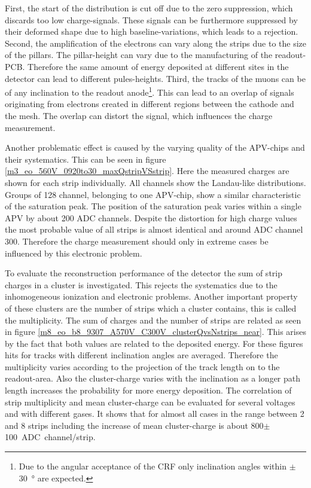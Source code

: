 \documentclass[
twoside,            %
BCOR1.4cm,          %
10pt,               %
headings=normal,    %
headsepline,        %
clearplainpage,		%
final,              %
div=14,
open=right,
bibliography=toc
]{scrreprt}
\begin{document}
First, the start of the distribution is cut off due to the zero suppression, which discards too low charge-signals.
These signals can be furthermore suppressed by their deformed shape due to high baseline-variations, which leads to a rejection.
Second, the amplification of the electrons can vary along the strips due to the size of the pillars.
The pillar-height can vary due to the manufacturing of the readout-PCB.
Therefore the same amount of energy deposited at different sites in the detector can lead to different pules-heights.
Third, the tracks of the muons can be of any inclination to the readout anode\footnote{
	Due to the angular acceptance of the CRF only inclination angles within $\pm$\SI{30}{\degree} are expected.
}.
This can lead to an overlap of signals originating from electrons created in different regions between the cathode and the mesh.
The overlap can distort the signal, which influences the charge measurement.

Another problematic effect is caused by the varying quality of the APV-chips and their systematics.
This can be seen in figure \ref{m3_eo_560V_0920to30_maxQstripVSstrip}.
Here the measured charges are shown for each strip individually.
All channels show the Landau-like distributions.
Groups of 128 channel, belonging to one APV-chip, show a similar characteristic of the saturation peak.
The position of the saturation peak varies within a single APV by about 200 ADC channels.
Despite the distortion for high charge values the most probable value of all strips is almost identical and around ADC channel 300.
Therefore the charge measurement should only in extreme cases be influenced by this electronic problem.

To evaluate the reconstruction performance of the detector the sum of strip charges in a cluster is investigated.
This rejects the systematics due to the inhomogeneous ionization and electronic problems.
Another important property of these clusters are the number of strips which a cluster contains, this is called the multiplicity.
The sum of charges and the number of strips are related as seen in figure \ref{m8_eo_b8_9307_A570V_C300V_clusterQvsNstrips_near}.
This arises by the fact that both values are related to the deposited energy.
For these figures hits for tracks with different inclination angles are averaged.
Therefore the multiplicity varies according to the projection of the track length on to the readout-area. 
Also the cluster-charge varies with the inclination as a longer path length increases the probability for more energy deposition.
The correlation of strip multiplicity and mean cluster-charge can be evaluated for several voltages and with different gases.
It shows that for almost all cases in the range between 2 and 8 strips including the increase of mean cluster-charge is about 800$\pm$\SI{100}{ADC channel/strip}.
\end{document}
